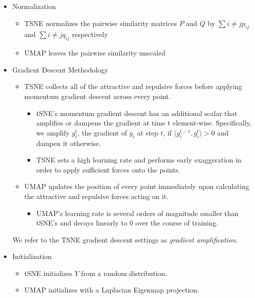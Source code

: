 \documentclass[sigconf, nonacm]{acmart}
\begin{document}
\begin{itemize}
    \item Normalization
        \begin{itemize}
            \item TSNE normalizes the pairwise similarity matrices $P$ and $Q$ by $\sum i \neq j p_{ij}$ and $\sum i \neq j q_{ij}$ respectively
            \item UMAP leaves the pairwise similarity unscaled
        \end{itemize}

    \item Gradient Descent Methodology
        \begin{itemize}
        \item TSNE collects all of the attractive and repulsive forces before applying momentum gradient descent across every point.
            \begin{itemize}
                \item tSNE's momentum gradient descent has an additional scalar that amplifies or dampens the gradient at time t element-wise. Specifically, we
                    amplify $g_i^t$, the gradient of $y_i$ at step $t$, if $\langle g_i^{t-1}, g_i^t \rangle > 0$ and dampen it otherwise.
                \item TSNE sets a high learning rate and performs early exaggeration \cite{van2008visualizing} in order to apply sufficient forces onto the points.
            \end{itemize}
        \item UMAP updates the position of every point immediately upon calculating the attractive and repulsive forces acting on it.
            \begin{itemize}
                \item UMAP's learning rate is several orders of magnitude smaller than tSNE's and decays linearly to 0 over the course of training.
            \end{itemize}
        \end{itemize}
        We refer to the TSNE gradient descent settings as \textit{gradient amplification}.

    \item Initialization
        \begin{itemize}
        \item tSNE initializes $Y$ from a random distribution.
        \item UMAP initializes with a Laplacian Eigenmap projection.
        \end{itemize}


\end{itemize}
\end{document}
